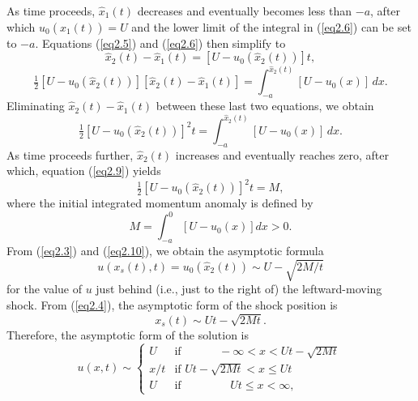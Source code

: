 \documentclass[10pt]{article}
\begin{document}
As time proceeds, $\hat{x}_1(t)$ decreases and eventually becomes less than $-a$,
after which $u_0(\hat{x}_1(t))=U$ and the lower limit of the integral in
(\ref{eq2.6}) can be set to $-a$. Equations (\ref{eq2.5}) and (\ref{eq2.6})
then simplify to
\begin{equation}                                 %
      \hat{x}_2(t) - \hat{x}_1(t) = \left[U - u_0(\hat{x}_2(t))\right] t,
\label{eq2.7}
\end{equation}
\begin{equation}                                 %
     \tfrac{1}{2}\left[U - u_0(\hat{x}_2(t))\right]\left[\hat{x}_2(t) - \hat{x}_1(t)\right]
     = \int_{-a}^{\hat{x}_2(t)} [U - u_0(x)]\,d x.
\label{eq2.8}
\end{equation}
Eliminating $\hat{x}_2(t) - \hat{x}_1(t)$ between these last two equations, we
obtain
\begin{equation}                                 %
     \tfrac{1}{2}\left[U - u_0(\hat{x}_2(t))\right]^2 t
     = \int_{-a}^{\hat{x}_2(t)} [U - u_0(x)]\,d x.
\label{eq2.9}
\end{equation}
As time proceeds further, $\hat{x}_2(t)$ increases and eventually reaches zero,
after which, equation (\ref{eq2.9}) yields
\begin{equation}                                 %
     \tfrac{1}{2}\left[U - u_0(\hat{x}_2(t))\right]^2 t = M,
\label{eq2.10}
\end{equation}
where the initial integrated momentum anomaly is defined by
\begin{equation}                                 %
      M = \int_{-a}^0 [U - u_0(x)] dx > 0.
\label{eq2.11}
\end{equation}
From (\ref{eq2.3}) and (\ref{eq2.10}), we obtain the asymptotic formula
\begin{equation}                                 %
      u(x_s(t),t) = u_0(\hat{x}_2(t)) \sim U - \sqrt{2M/t}
\label{eq2.12}
\end{equation}
for the value of $u$ just behind (i.e., just to the right of)
the leftward-moving shock.
From (\ref{eq2.4}), the asymptotic form of the shock position is
\begin{equation}                                 %
     x_s(t) \sim Ut - \sqrt{2Mt}.
\label{eq2.13}
\end{equation}
Therefore, the asymptotic form of the solution is
\begin{equation}                                 %
   u(x,t) \sim
          \begin{cases}
             U    & \text{if } \qquad\quad        -\infty < x < Ut - \sqrt{2Mt} \\
             x/t  & \text{if }            Ut - \sqrt{2Mt} < x \le Ut   \\
	     U    & \text{if } \qquad\qquad          Ut \le x < \infty,
          \end{cases}
\label{eq2.14}
\end{equation}
\end{document}
